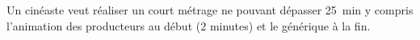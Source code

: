 
\begin{exercice}\label{exo2smath-0102}

    Un cinéaste veut réaliser un court métrage ne pouvant dépasser \SI{25}{\minute} y compris l'animation des producteurs au début (\( 2\) minutes) et le générique à la fin.

\end{exercice}

